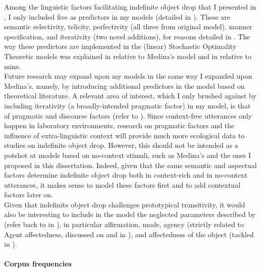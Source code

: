 Among the linguistic factors facilitating indefinite object drop that I presented in , I only included five as predictors in my models (detailed in ). These are semantic selectivity, telicity, perfectivity (all three from  original model), manner specification, and iterativity (two novel additions), for reasons detailed in . The way these predictors are implemented in the (linear) Stochastic Optimality Theoretic models was explained in  relative to Medina's model and in  relative to mine.\\
Future research may expand upon my models in the same way I expanded upon Medina's, namely, by introducing additional predictors in the model based on theoretical literature. A relevant area of interest, which I only brushed against by including iterativity (a broadly-intended pragmatic factor) in my model, is that of pragmatic and discourse factors (refer to ). Since context-free utterances only happen in laboratory environments, research on pragmatic factors and the influence of extra-linguistic context will provide much more ecological data to studies on indefinite object drop. However, this should not be intended as a potshot at models based on no-context stimuli, such as Medina's and the ones I proposed in this dissertation. Indeed, given that the same semantic and aspectual factors determine indefinite object drop both in context-rich and in no-context utterances, it makes sense to model these factors first and to add contextual factors later on.\\
Given that indefinite object drop challenges prototypical transitivity, it would also be interesting to include in the model the neglected parameters described by \textcite{HopperThompson1980} (refer back to  in ), in particular affirmation, mode, agency (strictly related to Agent affectedness, discussed on  and in ), and affectedness of the object (tackled in ).

\paragraph{Corpus frequencies}

